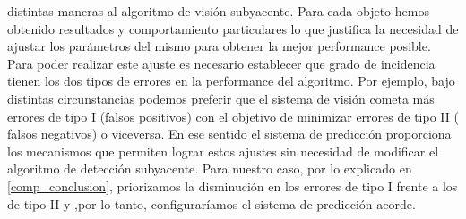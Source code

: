 distintas maneras al algoritmo de visi\'on subyacente. Para cada objeto 
hemos obtenido resultados y comportamiento particulares lo que 
justifica la necesidad de ajustar los par\'ametros del mismo para obtener la mejor 
performance posible. Para poder realizar este ajuste es necesario 
establecer que grado de incidencia tienen los dos tipos de errores en la performance del
algoritmo. Por ejemplo, bajo distintas circunstancias podemos preferir que el  
sistema de visi\'on cometa m\'as errores de tipo I (falsos positivos) con 
el objetivo de minimizar errores de tipo II ( falsos negativos) o 
viceversa. En ese sentido el sistema de predicci\'on proporciona los mecanismos que 
permiten lograr estos ajustes sin necesidad de modificar el algoritmo de detecci\'on 
subyacente. Para nuestro caso, por lo explicado en \ref{comp_conclusion}, priorizamos 
la disminuci\'on en los errores de tipo I frente a los de tipo II y ,por lo tanto, configurar\'iamos
el sistema de predicci\'on acorde.
 

